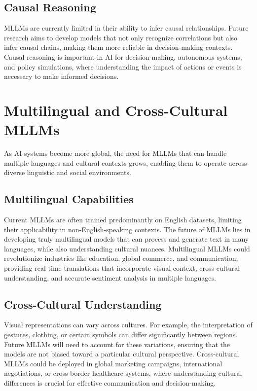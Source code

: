 \subsection{Causal Reasoning}

MLLMs are currently limited in their ability to infer causal relationships. Future research aims to develop models that not only recognize correlations but also infer causal chains, making them more reliable in decision-making contexts. Causal reasoning is important in AI for decision-making, autonomous systems, and policy simulations, where understanding the impact of actions or events is necessary to make informed decisions.

\section{Multilingual and Cross-Cultural MLLMs}

As AI systems become more global, the need for MLLMs that can handle multiple languages and cultural contexts grows, enabling them to operate across diverse linguistic and social environments.

\subsection{Multilingual Capabilities}

Current MLLMs are often trained predominantly on English datasets, limiting their applicability in non-English-speaking contexts. The future of MLLMs lies in developing truly multilingual models that can process and generate text in many languages, while also understanding cultural nuances. Multilingual MLLMs could revolutionize industries like education, global commerce, and communication, providing real-time translations that incorporate visual context, cross-cultural understanding, and accurate sentiment analysis in multiple languages.

\subsection{Cross-Cultural Understanding}

Visual representations can vary across cultures. For example, the interpretation of gestures, clothing, or certain symbols can differ significantly between regions. Future MLLMs will need to account for these variations, ensuring that the models are not biased toward a particular cultural perspective. Cross-cultural MLLMs could be deployed in global marketing campaigns, international negotiations, or cross-border healthcare systems, where understanding cultural differences is crucial for effective communication and decision-making.

